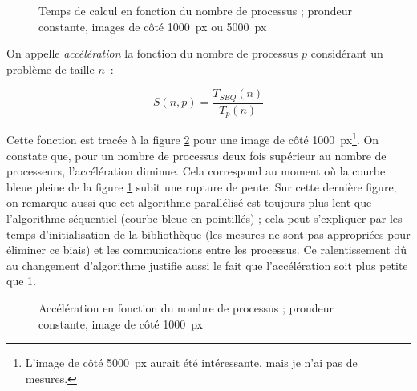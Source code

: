 \begin{figure}
  \centering


  \caption{Temps de calcul en fonction du nombre de processus ;
    prondeur constante, images de côté 1000~px ou 5000~px}
  \label{fig:mandel:stat:one-nproc}
\end{figure}

On appelle \emph{accélération} la fonction du nombre de processus
$p$ considérant un problème de taille $n$~:

$$ S(n, p) = \frac{T_{SEQ}(n)}{T_p(n)} $$

Cette fonction est tracée à la figure
\ref{fig:mandel:stat:accel-nproc} pour une image de côté
1000~px\footnote{L'image de côté 5000~px aurait été intéressante, mais
  je n'ai pas de mesures.}. On constate que, pour un nombre de
processus deux fois supérieur au nombre de processeurs, l'accélération
diminue. Cela correspond au moment où la courbe bleue pleine de la
figure \ref{fig:mandel:stat:one-nproc} subit une rupture de pente. Sur
cette dernière figure, on remarque aussi que cet algorithme
parallélisé est toujours plus lent que l'algorithme séquentiel (courbe
bleue en pointillés) ; cela peut s'expliquer par les temps
d'initialisation de la bibliothèque (les mesures ne sont pas
appropriées pour éliminer ce biais) et les communications entre les
processus. Ce ralentissement dû au changement d'algorithme justifie
aussi le fait que l'accélération soit plus petite que 1.

\begin{figure}
  \centering


  \caption{Accélération en fonction du nombre de processus ;
    prondeur constante, image de côté 1000~px}
  \label{fig:mandel:stat:accel-nproc}
\end{figure}

